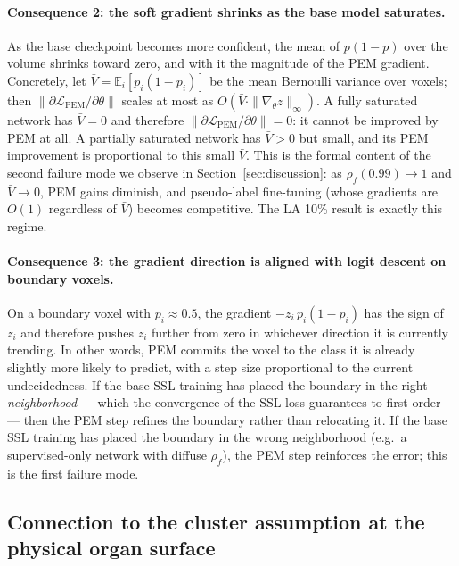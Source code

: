 \paragraph{Consequence 2: the soft gradient shrinks as the base model saturates.}
As the base checkpoint becomes more confident, the mean of $p(1{-}p)$ over the volume shrinks toward zero, and with it the magnitude of the PEM gradient. Concretely, let $\bar V \!=\! \mathbb{E}_i[p_i(1{-}p_i)]$ be the mean Bernoulli variance over voxels; then $\|\partial \mathcal{L}_{\mathrm{PEM}} / \partial \theta\|$ scales at most as $O(\bar V \cdot \|\nabla_\theta z\|_\infty)$. A fully saturated network has $\bar V\!=\!0$ and therefore $\|\partial \mathcal{L}_{\mathrm{PEM}} / \partial \theta\|\!=\!0$: it cannot be improved by PEM at all. A partially saturated network has $\bar V\!>\!0$ but small, and its PEM improvement is proportional to this small $\bar V$. This is the formal content of the second failure mode we observe in Section~\ref{sec:discussion}: as $\rho_f(0.99)\!\to\!1$ and $\bar V\!\to\!0$, PEM gains diminish, and pseudo-label fine-tuning (whose gradients are $O(1)$ regardless of $\bar V$) becomes competitive. The LA 10\% result is exactly this regime.

\paragraph{Consequence 3: the gradient direction is aligned with logit descent on boundary voxels.}
On a boundary voxel with $p_i\!\approx\!0.5$, the gradient $-z_i\,p_i(1{-}p_i)$ has the sign of $z_i$ and therefore pushes $z_i$ further from zero in whichever direction it is currently trending. In other words, PEM commits the voxel to the class it is already slightly more likely to predict, with a step size proportional to the current undecidedness. If the base SSL training has placed the boundary in the right \emph{neighborhood} --- which the convergence of the SSL loss guarantees to first order --- then the PEM step refines the boundary rather than relocating it. If the base SSL training has placed the boundary in the wrong neighborhood (e.g.\ a supervised-only network with diffuse $\rho_f$), the PEM step reinforces the error; this is the first failure mode.

\subsection{Connection to the cluster assumption at the physical organ surface}
\label{sec:theory:cluster}

